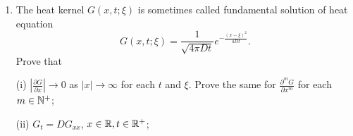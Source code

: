 \documentclass[6pt]{article}
\newtheorem{solution}{Solution}
\numberwithin{equation}{section}
\def\mathbb{\Bbb}
\begin{document}
\begin{enumerate}
\begin{solution}
\begin{align}
J=& \overbrace{\frac{1}{\pi}\sum_{k=1}^\infty e^{-D(2k \Delta w)^2t}\Big(\cos 2k\Delta w(x+\xi)-\cos ((2k-1)\Delta w(x+\xi))\Big) \Delta w}^{J_1} \nonumber\\
&+ \overbrace{\frac{1}{\pi}\sum_{k=1}^\infty\Big(e^{-D(2k \Delta w)^2t}- e^{-D((2k-1)\Delta w)^2t}\Big) \Big(\cos ((2k-1)\Delta w(x+\xi))\Big)\Delta w}^{J_2}
\end{align}

To cook up $J_1$, we use the compound--angle formula $\cos a-\cos b=-2\sin \frac{a+b}{2}\sin \frac{a-b}{2}$ to have that
\[J_1=\frac{1}{\pi}\sum_{k=1}^\infty e^{-D(2k \Delta w)^2t} (-2)\sin \Delta w(x+\xi)\sin\big((2k-1)\Delta w(x+\xi)\big) \Delta w;\]
note that for $x$ and $\xi$ fixed, $\sin \Delta w(x+\xi)=O(\Delta w)$ as $\Delta w\rightarrow 0$, therefore we have from the fact $|\sin\big((2k-1)\Delta w(x+\xi)\big)|\leq1$ that
\[|J_1|\leq O(\Delta w) \overbrace{\sum_{k=1}^\infty e^{-D(2k \Delta w)^2t} \Delta w}^{J_{11}},\]
with $\frac{2}{\pi}$ embedded into $O(\Delta w)$.  It is easy to see that
\[J_{11}\rightarrow \int_{-\infty}^\infty e^{-D(2 w)^2t}dw<\infty,\]
therefore $J_1 \rightarrow 0$ as $\Delta w\rightarrow 0$.

To estimate $J_2$, we first have from Mean Value Theorem that, for some $k^*\in[k-\frac{1}{2},k]$ one has
\[e^{-D(2k \Delta w)^2t}- e^{-D((2k-1)\Delta w)^2t}=e^{-D(2k^* \Delta w)^2t}(Dt)(\Delta w)((4k-1)\Delta w).\]
Why? It holds because $e^{-a^2}-e^{-b^2}=e^{-c^2}(b^2-a^2)$ for some $c\in[a,b]$.  Therefore one has that
\[|J_2|\leq O(\Delta w)\frac{1}{\pi}\sum_{k=1}^\infty  e^{-D(2k^* \Delta w)^2t}((4k-1)\Delta w) \Delta w,\]
which again converges to zero, since this infinite series is finite (either you can find it to be an approximate of an integral or show directly that it is bounded).  This verifies that $J\rightarrow 0$ as $\Delta w\rightarrow 0$.  Finally, we finish the proof and collect (\ref{sol}) as expected.
\end{solution}


\item   The heat kernel $G(x,t;\xi)$ is sometimes called fundamental solution of heat equation
\[G(x,t;\xi)=\frac{1}{\sqrt{4\pi Dt}}e^{-\frac{(x-\xi)^2}{4Dt}}.\]
Prove that

(i) $|\frac{\partial G}{\partial x}|\rightarrow 0$ as $|x|\rightarrow\infty$ for each $t$ and $\xi$.  Prove the same for $\frac{\partial^m G}{\partial x^m}$ for each $m\in \mathbb N^+$;

(ii) $G_t=DG_{xx}$, $x\in\mathbb R,t\in\mathbb R^+$;


\end{enumerate}
\end{document}
